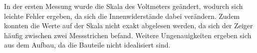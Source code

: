 In der ersten Messung wurde die Skala des Voltmeters geändert, wodurch sich leichte
Fehler ergeben, da sich die Innenwiderstände dabei verändern. Zudem konnten die 
Werte auf der Skala nicht exakt abgelesen werden,
da sich der Zeiger häufig zwischen zwei Messstrichen befand. Weitere Ungenauigkeiten
ergeben sich aus dem Aufbau, da die Bauteile nicht idealisiert sind.
